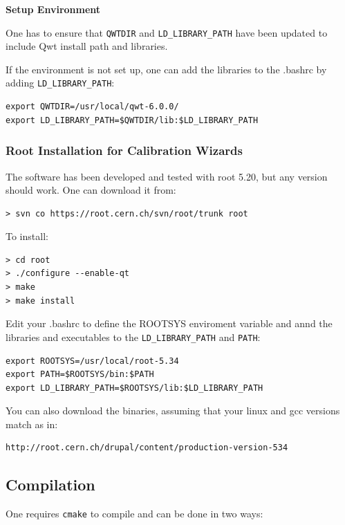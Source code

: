 \documentclass{article}
\begin{document}
\textbf{Setup Environment} 


One has to ensure that \verb=QWTDIR= and \verb=LD_LIBRARY_PATH= have
been updated to include Qwt install path and libraries.


If the environment is not set up, one can add the libraries to the
.bashrc by adding \verb=LD_LIBRARY_PATH=:
\begin{verbatim}
export QWTDIR=/usr/local/qwt-6.0.0/
export LD_LIBRARY_PATH=$QWTDIR/lib:$LD_LIBRARY_PATH
\end{verbatim}







\subsubsection{Root Installation for Calibration Wizards}
The software has been developed and tested with root 5.20, but any version
should work. One can download it from:
\begin{verbatim}
> svn co https://root.cern.ch/svn/root/trunk root
\end{verbatim}

\noindent To install:
\begin{verbatim}
> cd root
> ./configure --enable-qt
> make
> make install
\end{verbatim}

Edit your .bashrc to define the ROOTSYS enviroment variable and annd
the libraries and executables to the \verb=LD_LIBRARY_PATH= and \verb=PATH=:
\begin{verbatim}
export ROOTSYS=/usr/local/root-5.34
export PATH=$ROOTSYS/bin:$PATH
export LD_LIBRARY_PATH=$ROOTSYS/lib:$LD_LIBRARY_PATH
\end{verbatim}

You can also download the binaries, assuming that your linux and gcc versions
match as in:
\begin{verbatim}
http://root.cern.ch/drupal/content/production-version-534
\end{verbatim}





\subsection{Compilation}
One requires \verb=cmake= to compile and can be done in two ways:
\end{document}
